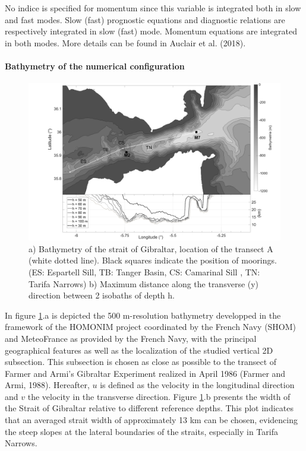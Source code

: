 No indice is specified for momentum since this variable is integrated both in slow and fast modes. Slow (fast) prognostic equations and diagnostic relations are respectively integrated in slow (fast) mode. Momentum equations are integrated in both modes. More details can be found in Auclair et al. (2018).

 \paragraph{Bathymetry of the numerical configuration}
 \label{BathyNum}
\begin{figure}[!h]
\centering
 \includegraphics[width=1\textwidth]{./papier2D/bathy3d+Rr3d.png}
 \caption { a) Bathymetry of the strait of Gibraltar, location of the transect A (white dotted line). Black squares indicate the position of moorings. (ES: Espartell Sill, TB: Tanger Basin, CS: Camarinal Sill , TN: Tarifa Narrows)
 b) Maximum distance along the transverse (y) direction between 2 isobaths of depth h.}
 \label{Fig1}
\end{figure}

\indent In figure \ref{Fig1}.a is depicted the 500 m-resolution bathymetry developped in the framework of the HOMONIM project coordinated by the French Navy (SHOM) and MeteoFrance as provided by the French Navy, with the  principal geographical features as well as the localization of the studied vertical 2D subsection. This subsection is chosen as close as possible to the transect of Farmer and Armi's Gibraltar Experiment realized in April 1986 (Farmer and Armi, 1988). Hereafter, $u$ is defined as the velocity in the longitudinal direction and $v$ the velocity in the transverse direction. Figure \ref{Fig1}.b presents the width of the Strait of Gibraltar relative to different reference depths. This plot indicates that an averaged strait width of approximately 13 km can be chosen, evidencing the steep slopes at the lateral boundaries of the straits, especially in Tarifa Narrows.

